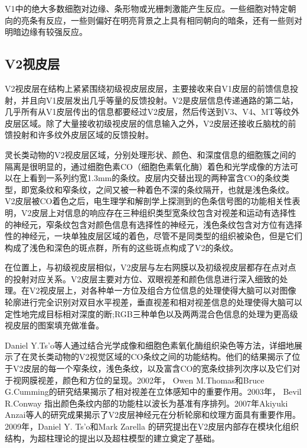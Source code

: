 \documentclass[a4paper,12pt]{article}
\begin{document}
V1中的绝大多数细胞对边缘、条形物或光栅刺激能产生反应\cite{15:book}。一些细胞对特定朝向的亮条有反应，一些则偏好在明亮背景之上具有相同朝向的暗条，还有一些则对明暗边缘有较强反应。


\subsection{V2视皮层}



V2视皮层\cite{9:article}在结构上紧紧围绕初级视皮层皮层，主要接收来自V1皮层的前馈信息投射，并且向V1皮层发出几乎等量的反馈投射。V2是皮层信息传递通路的第二站，几乎所有从V1皮层传出的信息都要经过V2皮层，然后传送到V3、V4、MT等纹外皮层区域。除了大量接收初级视皮层的信息输入之外，V2皮层还接收丘脑枕的前馈投射和许多纹外皮层区域的反馈投射。


灵长类动物的V2视皮层区域\cite{16:book}，分别处理形状、颜色、和深度信息的细胞簇之间的隔离是很明显的，通过细胞色素CO（细胞色素氧化酶）着色和光学成像的方法可以在上看到一系列约宽1.3mm的条纹。皮层内交替出现的两种富含CO的条纹类型，即宽条纹和窄条纹，之间又被一种着色不深的条纹隔开，也就是浅色条纹。V2皮层被CO着色之后，电生理学和解剖学上探测到的色条信号图的功能相关性表明，V2皮层上对信息的响应存在三种组织类型宽条纹包含对视差和运动有选择性的神经元，窄条纹包含对颜色信息有选择性的神经元，浅色条纹包含对方位有选择性的神经元，一块单独皮层区域的着色，尽管不是同类型的组织被染色，但是它们构成了浅色和深色的斑点群，所有的这些斑点构成了V2的条纹。


在位置上，与初级视皮层相似，V2皮层与左右网膜以及初级视皮层都存在点对点的投射对应关系\cite{5:article}。V2皮层主要对方位、双眼视差和颜色信息进行深入细致的处理。在V2视皮层上，对各种单一方位及组合方位信息的处理使得大脑可以对图像轮廓进行完全识别对双目水平视差，垂直视差和相对视差信息的处理使得大脑可以定性地完成目标相对深度的断;RGB三种单色以及两两混合色信息的处理为更高级视皮层的图案填充做准备。


Daniel Y.Ts’o等人通过结合光学成像和细胞色素氧化酶组织染色等方法，详细地展示了在灵长类动物的V2视觉区域的CO条纹之间的功能结构。他们的结果揭示了位于V2皮层的每一个窄条纹，浅色条纹，以及富含CO的宽条纹排列次序以及它们对于视网膜视差，颜色和方位的呈现。2002年， Owen M.Thomas和Bruce G.Cumming的研究结果\cite{16:book}揭示了相对视差在立体感知中的重要作用。2003年， Bevil R.Conway 指出颜色条纹内部的功能柱以波长为基准有序排列。2007年Akiyuki Anzai等人的研究成果揭示了V2皮层神经元在分析轮廓和纹理方面具有重要作用。2009年，Daniel Y. Ts’o和Mark Zarella 的研究提出在V2皮层内部存在模块化组织结构，为超柱理论的提出以及超柱模型的建立奠定了基础。
\end{document}
